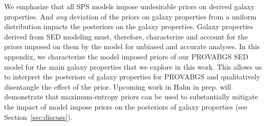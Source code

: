 We emphasize that all SPS models impose undesirable priors on derived galaxy
properties. 
And \emph{any} deviation of the priors on galaxy properties from a uniform
distribution impacts the posteriors on the galaxy properties. 
Galaxy properties derived from SED modeling must, therefore, characterize
and account for the priors imposed on them by the model for unbiased and
accurate analyses. 
In this appendix, we characterize the model imposed priors of our PROVABGS SED
model for the main galaxy properties that we explore in this work. 
This allows us to interpret the posteriors of galaxy properties for PROVABGS
and qualitatively disentangle the effect of the prior. 
Upcoming work in Hahn in prep. will demonstrate that maximum-entropy priors can
be used to substantially mitigate the impact of model impose priors on the
posteriors of galaxy properties (see Section~\ref{sec:discuss}). 
